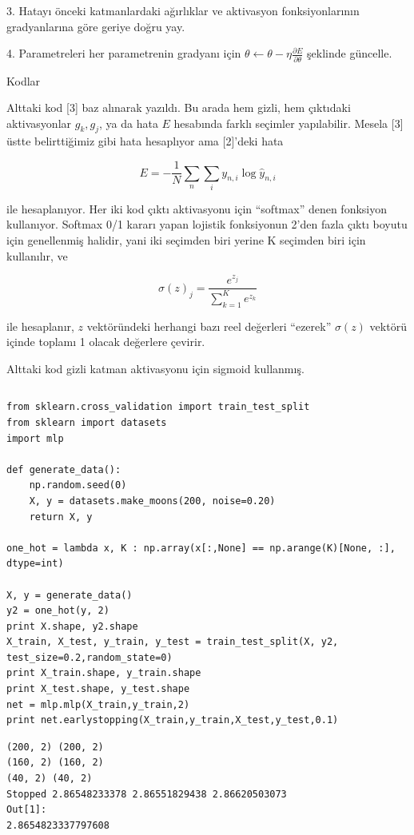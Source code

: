 \documentclass[12pt,fleqn]{article}\usepackage{../../common}
\begin{document}
3. Hatayı önceki katmanlardaki ağırlıklar ve aktivasyon fonksiyonlarının
gradyanlarına göre geriye doğru yay.

4. Parametreleri her parametrenin gradyanı için $\theta \leftarrow \theta -
\eta \frac{\partial E}{\partial \theta}$ şeklinde güncelle.

Kodlar

Alttaki kod [3] baz alınarak yazıldı. Bu arada hem gizli, hem çıktıdaki
aktivasyonlar $g_k,g_j$, ya da hata $E$ hesabında farklı seçimler
yapılabilir. Mesela [3] üstte belirttiğimiz gibi hata hesaplıyor ama
[2]'deki hata

$$ E = -\frac{1}{N} \sum_n \sum_i y_{n,i} \log \hat{y}_{n,i}$$

ile hesaplanıyor. Her iki kod çıktı aktivasyonu için ``softmax'' denen
fonksiyon kullanıyor. Softmax 0/1 kararı yapan lojistik fonksiyonun 2'den
fazla çıktı boyutu için genellenmiş halidir, yani iki seçimden biri yerine
K seçimden biri için kullanılır, ve

$$ \sigma(z)_j = \frac{e^{z_j}}{\sum _{k=1}^{K} e^{z_k}}$$

ile hesaplanır, $z$ vektöründeki herhangi bazı reel değerleri ``ezerek''
$\sigma(z)$ vektörü içinde toplamı 1 olacak değerlere çevirir. 

Alttaki kod gizli katman aktivasyonu için sigmoid kullanmış. 

\inputminted[fontsize=\footnotesize]{python}{mlp.py}

\begin{verbatim}
from sklearn.cross_validation import train_test_split
from sklearn import datasets
import mlp

def generate_data():
    np.random.seed(0)
    X, y = datasets.make_moons(200, noise=0.20)
    return X, y

one_hot = lambda x, K : np.array(x[:,None] == np.arange(K)[None, :], dtype=int)

X, y = generate_data()
y2 = one_hot(y, 2)
print X.shape, y2.shape
X_train, X_test, y_train, y_test = train_test_split(X, y2, test_size=0.2,random_state=0)
print X_train.shape, y_train.shape
print X_test.shape, y_test.shape
net = mlp.mlp(X_train,y_train,2)
print net.earlystopping(X_train,y_train,X_test,y_test,0.1)
\end{verbatim}

\begin{verbatim}
(200, 2) (200, 2)
(160, 2) (160, 2)
(40, 2) (40, 2)
Stopped 2.86548233378 2.86551829438 2.86620503073
Out[1]: 
2.8654823337797608
\end{verbatim}
\end{document}
